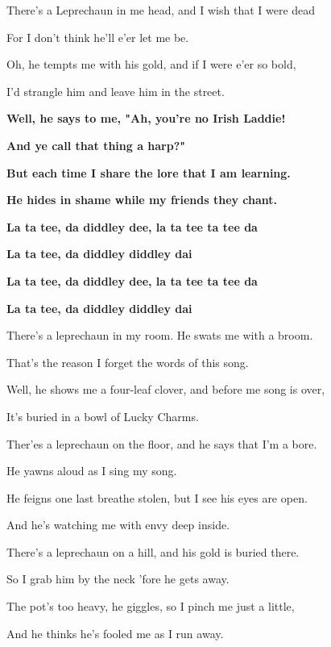 There's a Leprechaun in me head, and I wish that I were dead

For I don't think he'll e'er let me be.

Oh, he tempts me with his gold, and if I were e'er so bold,

I'd strangle him and leave him in the street.

\bigskip

\textbf{Well, he says to me, "Ah, you're no Irish Laddie!}

\textbf{And ye call that thing a harp?"}

\textbf{But each time I share the lore that I am learning.}

\textbf{He hides in shame while my friends they chant. }

\textbf{La ta tee, da diddley dee, la ta tee ta tee da}

\textbf{La ta tee, da diddley diddley dai}

\textbf{La ta tee, da diddley dee, la ta tee ta tee da}

\textbf{La ta tee, da diddley diddley dai}

\bigskip

There's a leprechaun in my room. He swats me with a broom.

That's the reason I forget the words of this song.

Well, he shows me a four-leaf clover, and before me song is over,

It's buried in a bowl of Lucky Charms.

\bigskip

Ther'es a leprechaun on the floor, and he says that I'm a bore.

He yawns aloud as I sing my song.

He feigns one last breathe stolen, but I see his eyes are open.

And he's watching me with envy deep inside.

\bigskip

There's a leprechaun on a hill, and his gold is buried there.

So I grab him by the neck 'fore he gets away.

The pot's too heavy, he giggles, so I pinch me just a little,

And he thinks he's fooled me as I run away.




